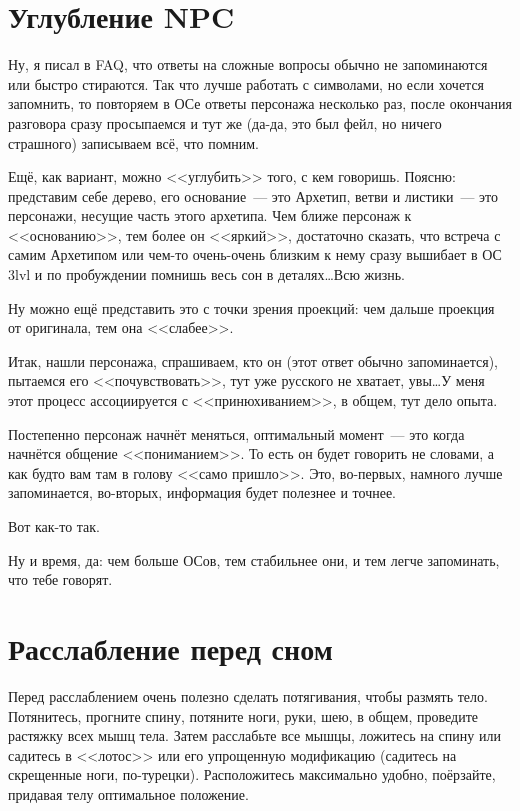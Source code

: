 \documentclass[a4paper,14pt,oneside]{memoir}
\begin{document}
\chapter{Углубление NPC}


Ну, я писал в FAQ, что ответы на сложные вопросы обычно не запоминаются или быстро стираются. Так что лучше работать с символами, но если хочется запомнить, то повторяем в ОСе ответы персонажа несколько раз, после окончания разговора сразу просыпаемся и тут же (да-да, это был фейл, но ничего страшного) записываем всё, что помним.
 
Ещё, как вариант, можно <<углубить>> того, с кем говоришь. Поясню: представим себе дерево, его основание~--- это Архетип, ветви и листики~--- это персонажи, несущие часть этого архетипа. Чем ближе персонаж к <<основанию>>, тем более он <<яркий>>, достаточно сказать, что встреча с самим Архетипом или чем-то очень-очень близким к нему сразу вышибает в ОС 3lvl и по пробуждении помнишь весь сон в деталях\ldots Всю жизнь.
 
Ну можно ещё представить это с точки зрения проекций: чем дальше проекция от оригинала, тем она <<слабее>>. 

Итак, нашли персонажа, спрашиваем, кто он (этот ответ обычно запоминается), пытаемся его <<почувствовать>>, тут уже русского не хватает, увы\ldots У меня этот процесс ассоциируется с <<принюхиванием>>, в общем, тут дело опыта. 

Постепенно персонаж начнёт меняться, оптимальный момент~--- это когда начнётся общение <<пониманием>>. То есть он будет говорить не словами, а как будто вам там в голову <<само пришло>>. Это, во-первых, намного лучше запоминается, во-вторых, информация будет полезнее и точнее.
 
Вот как-то так.
 
Ну и время, да: чем больше ОСов, тем стабильнее они, и тем легче запоминать, что тебе говорят. 



\chapter{Расслабление перед сном}
Перед расслаблением очень полезно сделать потягивания, чтобы размять тело. Потянитесь, прогните спину, потяните ноги, руки, шею, в общем, проведите растяжку всех мышц тела. Затем расслабьте все мышцы, ложитесь на спину или садитесь в <<лотос>> или его упрощенную модификацию (садитесь на скрещенные ноги, по-турецки). Расположитесь максимально удобно, поёрзайте, придавая телу оптимальное положение.
\end{document}
